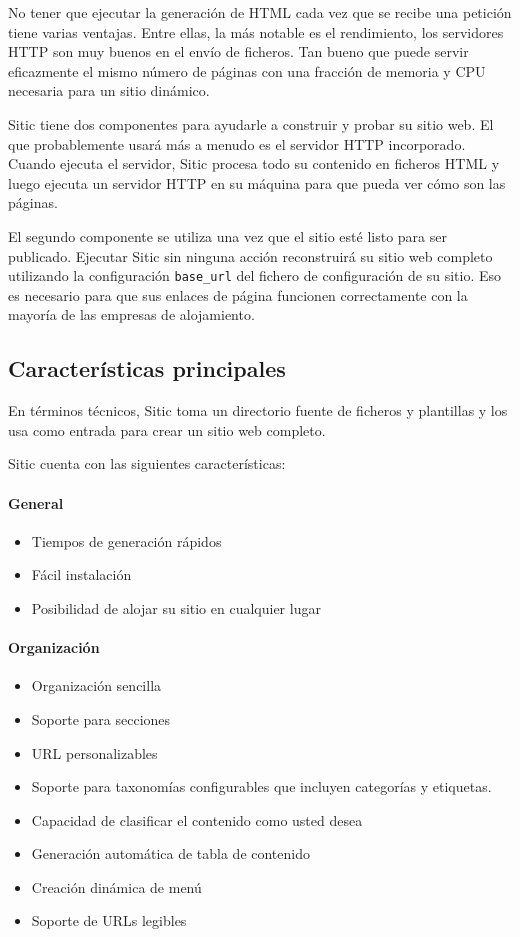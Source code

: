 \documentclass[a4paper,12pt]{article}
\begin{document}
No tener que ejecutar la generación de HTML cada vez que se recibe una petición tiene varias ventajas. Entre ellas,
la más notable es el rendimiento, los servidores HTTP son muy buenos en el envío de ficheros. Tan bueno que puede
servir eficazmente el mismo número de páginas con una fracción de memoria y CPU necesaria para un sitio dinámico.

Sitic tiene dos componentes para ayudarle a construir y probar su sitio web. El que probablemente usará más a menudo es el
servidor HTTP incorporado. Cuando ejecuta el servidor, Sitic procesa todo su contenido en ficheros HTML y luego ejecuta
un servidor HTTP en su máquina para que pueda ver cómo son las páginas.

El segundo componente se utiliza una vez que el sitio esté listo para ser publicado.
Ejecutar Sitic sin ninguna acción reconstruirá su sitio web completo utilizando la configuración \texttt{base\_url}
del fichero de configuración de su sitio. Eso es necesario para que sus enlaces de página funcionen correctamente
con la mayoría de las empresas de alojamiento.

\subsection{Características principales}

En términos técnicos, Sitic toma un directorio fuente de ficheros
y plantillas y los usa como entrada para crear un sitio web completo.

Sitic cuenta con las siguientes características:

\paragraph{General}

\begin{itemize}
\item Tiempos de generación rápidos
\item Fácil instalación
\item Posibilidad de alojar su sitio en cualquier lugar
\end{itemize}

\paragraph{Organización}

\begin{itemize}
\item Organización sencilla
\item Soporte para secciones
\item URL personalizables
\item Soporte para taxonomías configurables que incluyen categorías y etiquetas.
\item Capacidad de clasificar el contenido como usted desea
\item Generación automática de tabla de contenido
\item Creación dinámica de menú
\item Soporte de URLs legibles
\end{itemize}
\end{document}
